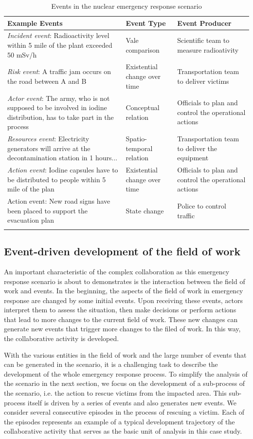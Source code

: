 {\footnotesize
\begin{longtable}{>{\raggedright}p{1.8in}>{\raggedright}p{1.8in}>{\raggedright}p{1.8in}}
\toprule 
\textbf{Example Events} & \textbf{Event Type} & \textbf{Event Producer}\tabularnewline
\midrule 
\emph{Incident event}: Radioactivity level within 5 mile of the plant
exceeded 50 mSv/h & Vale comparison & Scientific team to measure radioativity\tabularnewline
\midrule 
\emph{Risk event}: A traffic jam occurs on the road between A and
B  & Existential change over time & Transportation team to deliver victims\tabularnewline
\midrule 
\emph{Actor event}: The army, who is not supposed to be involved in
iodine distribution, has to take part in the process & Conceptual relation & Officials to plan and control the operational actions\tabularnewline
\midrule 
\emph{Resources event}: Electricity generators will arrive at the
decontamination station in 1 hours... & Spatio-temporal relation & Transportation team to deliver the equipment\tabularnewline
\midrule 
\emph{Action event}: Iodine capsules have to be distributed to people
within 5 mile of the plan & Existential change over time & Officials to plan and control the operational actions\tabularnewline
\midrule 
Action event: New road signs have been placed to support the evacuation
plan & State change & Police to control traffic\tabularnewline
\bottomrule
\caption{Events in the nuclear emergency response scenario}
\label{tab:events_in_scenario}
\end{longtable}
}


\subsection{Event-driven development of the field of work} %
\label{sub:event_driven_activity_development}
An important characteristic of the complex collaboration as this emergency response scenario is about to demonstrates is the interaction between the field of work and events. In the beginning, the aspects of the field of work in emergency response are changed by some initial events. Upon receiving these events, actors interpret them to assess the situation, then make decisions or perform actions that lead to more changes to the current field of work. These new changes can generate new events that trigger more changes to the filed of work. In this way, the collaborative activity is developed.

With the various entities in the field of work and the large number of events that can be generated in the scenario, it is a challenging task to describe the development of the whole emergency response process. To simplify the analysis of the scenario in the next section, we focus on the development of a sub-process of the scenario, i.e. the action to rescue victims from the impacted area. This sub-process itself is driven by a series of events and also generates new events. We consider several consecutive episodes in the process of rescuing a victim. Each of the episodes represents an example of a typical development trajectory of the collaborative activity that serves as the basic unit of analysis in this case study.


